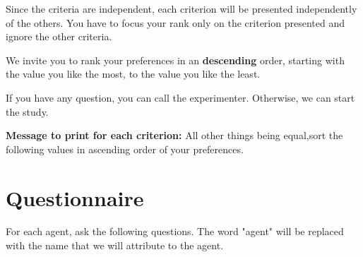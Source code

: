 \documentclass [french]{paper}
\begin{document}
			Since the criteria are independent, each criterion will be presented independently of the others. You have to focus your rank only on the criterion presented and ignore the other criteria.
			
			We invite you to rank your preferences in an \textbf {descending} order, starting with the value you like the most,  to the value you like the least.
			
			If you have any question, you can call the experimenter. Otherwise, we can start the study.
		
				 
				\textbf{Message to print for each criterion:}  All other things being equal,sort the following values in ascending order of your preferences.
		
		
		\section{Questionnaire}
			For each agent, ask the following questions. The word "agent" will be replaced with the name that we will attribute to the agent.
\end{document}
